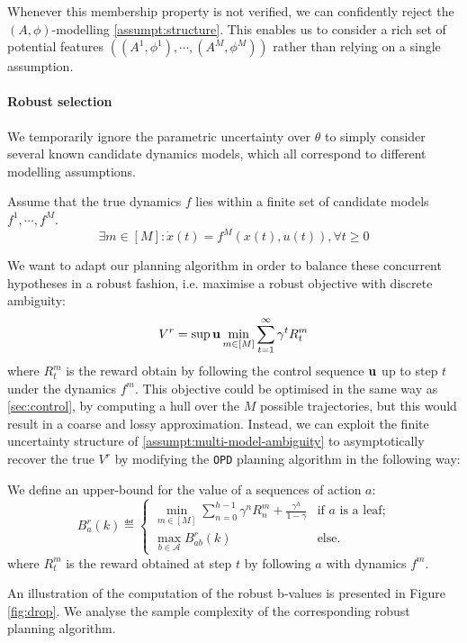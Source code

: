\documentclass{article}
\begin{document}
Whenever this membership property is not verified, we can confidently reject the $(A,\phi)$-modelling \autoref{assumpt:structure}. This enables us to consider a rich set of potential features $\left((A^1, \phi^1), \cdots, (A^M, \phi^M)\right)$ rather than relying on a single assumption.

\paragraph{Robust selection}

We temporarily ignore the parametric uncertainty over $\theta$ to simply consider several known candidate dynamics models, which all correspond to different modelling assumptions.

\begin{assumption}
\label{assumpt:multi-model-ambiguity}
Assume that the true dynamics $f$ lies within a finite set of candidate models $f^1, \cdots, f^M$.
\begin{equation}
\exists m\in[M]: \dot{x}(t) = f^M(x(t), u(t)), \forall t\geq 0
\end{equation}
\end{assumption}
We want to adapt our planning algorithm in order to balance these concurrent hypotheses in a robust fashion, i.e. maximise a robust objective with discrete ambiguity:
\begin{equation}
\label{eq:robust-objective-discrete}
V^r = \sup{\mathbf{u}}\min_{m\in[M]} \sum_{t=1}^\infty \gamma^t R_t^m
\end{equation}
where $R_t^m$ is the reward obtain by following the control sequence $\mathbf{u}$ up to step $t$ under the dynamics $f^m$.
This objective could be optimised in the same way as \ref{sec:control}, by computing a hull over the $M$ possible trajectories, but this would result in a coarse and lossy approximation. Instead, we can exploit the finite uncertainty structure of \autoref{assumpt:multi-model-ambiguity} to asymptotically recover the true $V^r$ by modifying the \texttt{OPD} planning algorithm in the following way:

\begin{definition} We define an upper-bound for the value of a sequences of action $a$:
\begin{equation}
\label{eq:robust-b-values}
B_a^r(k)  \eqdef
\begin{cases}
\min_{m\in[M]} \sum_{n=0}^{h-1} \gamma^n R_n^m  + \frac{\gamma^h}{1-\gamma} &\text{if } a \text{ is a leaf;}\\
\max_{b\in\mathcal{A}} B_{ab}^r(k) & \text{else.}
\end{cases}
\end{equation}
where $R_t^m$ is the reward obtained at step $t$ by following $a$ with dynamics $f^m$.
\end{definition}
An illustration of the computation of the robust b-values is presented in Figure \ref{fig:drop}. We analyse the sample complexity of the corresponding robust planning algorithm.
\end{document}
